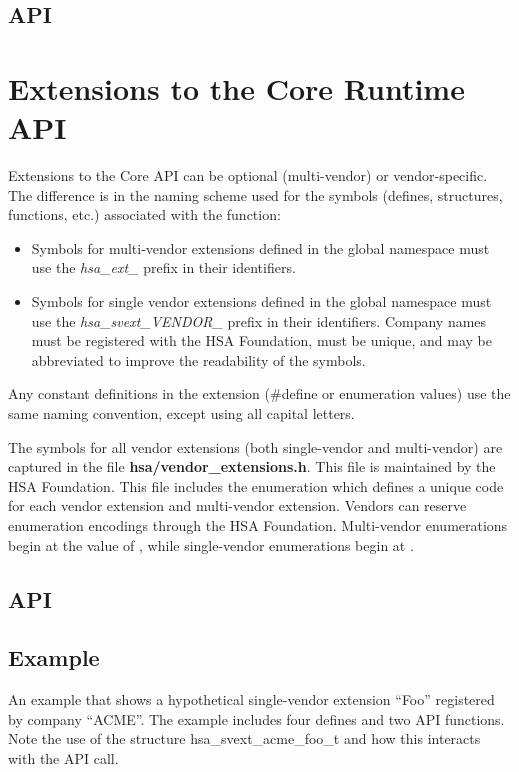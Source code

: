 \documentclass[final,oneside]{book}
\newcommand{\reftyp}[1]{#1}
\begin{document}
\subsection{API}



\section{Extensions to the Core Runtime API}\label{extensions}
Extensions to the Core API can be optional (multi-vendor) or
vendor-specific. The difference is in the naming scheme used for the symbols
(defines, structures, functions, etc.) associated with the function:

\begin{itemize}
\item Symbols for multi-vendor extensions defined in the global namespace must
  use the \emph{hsa_ext_} prefix in their identifiers.
\item Symbols for single vendor extensions defined in the global namespace must
  use the \emph{hsa_svext_VENDOR_} prefix in their identifiers. Company names
  must be registered with the HSA Foundation, must be unique, and may be
  abbreviated to improve the readability of the symbols.
\end{itemize}

Any constant definitions in the extension (\#define or enumeration values) use
the same naming convention, except using all capital letters.

The symbols for all vendor extensions (both single-vendor and multi-vendor) are
captured in the file {\bf hsa/vendor_extensions.h}. This file is maintained by
the HSA Foundation. This file includes the enumeration 
which defines a unique code for each vendor extension and multi-vendor
extension. Vendors can reserve enumeration encodings through the HSA
Foundation. Multi-vendor enumerations begin at the value of
, while single-vendor enumerations begin at
.

\subsection{API}


\subsection{Example}
An example that shows a hypothetical single-vendor extension ``Foo'' registered
by company ``ACME''. The example includes four defines and two API functions.
Note the use of the structure \reftyp{hsa_svext_acme_foo_t} and how this
interacts with the  API call.
\end{document}
